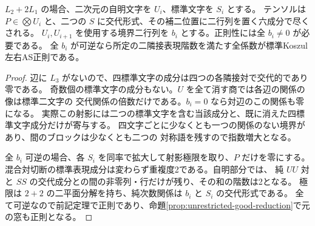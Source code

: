 \begin{proposition}\label{prop:one-standard-sl2-slice}
$L_2+2L_1$ の場合、二次元の自明文字を $U_i$、標準文字を $S_i$ とする。
テンソルは $P\in\bigotimes U_i$ と、二つの $S$ に交代形式、その補二位置に二行列を置く六成分で尽くされる。
$U_i,U_{i+1}$ を使用する境界二行列を $b_i$ とする。正則性には全 $b_i\ne0$ が必要である。
全 $b_i$ が可逆なら所定の二隣接表現階数を満たす全係数が標準Koszul左右AS正則である。
\end{proposition}
\begin{proof}
辺に $L_3$ がないので、四標準文字の成分は四つの各隣接対で交代的であり零である。
奇数個の標準文字の成分もない。$U$ を全て消す商では各辺の関係の像は標準二文字の
交代関係の倍数だけである。$b_i=0$ なら対辺のこの関係も零になる。
実際この射影には二つの標準文字を含む当該成分と、既に消えた四標準文字成分だけが寄与する。
四文字ごとに少なくとも一つの関係のない境界があり、間のブロックは少なくとも二つの
対称語を残すので指数増大となる。

全 $b_i$ 可逆の場合、各 $S_i$ を同率で拡大して射影極限を取り、$P$ だけを零にする。
混合対切断の標準表現成分は変わらず重複度2である。自明部分では、
純 $UU$ 対と $SS$ の交代成分との間の非零列・行だけが残り、その和の階数は2となる。
極限は $2+2$ の二平面分解を持ち、純次数関係は $b_i$ と $S_i$ の交代形式である。
全て可逆なので前記定理で正則であり、命題\ref{prop:unrestricted-good-reduction}で元の窓も正則となる。
\end{proof}
